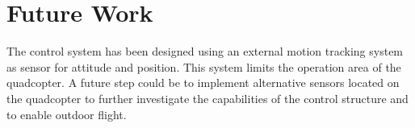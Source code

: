 \section{Future Work}\label{sec:futurework}
The control system has been designed using an external motion tracking system as sensor for attitude and position. This system limits the operation area of the quadcopter. A future step could be to implement alternative sensors located on the quadcopter to further investigate the capabilities of the control structure and to enable outdoor flight.
